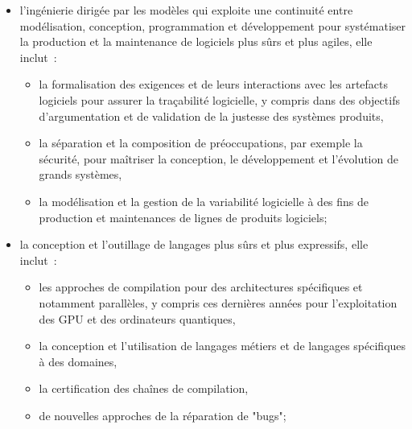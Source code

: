 \documentclass[11pt]{article}
\begin{document}
\begin{itemize}
  \renewcommand{\labelitemi}{$\bullet$}
\item l'ingénierie dirigée par les modèles qui exploite une continuité entre  modélisation, conception, programmation et développement pour systématiser la production et la maintenance de logiciels plus sûrs et plus agiles, elle inclut~:
\begin{itemize}
\item la formalisation des exigences et de leurs interactions avec les artefacts logiciels pour assurer la traçabilité logicielle, y compris dans des objectifs d'argumentation et de validation de la justesse des systèmes produits, 
\item la séparation et la composition de préoccupations, par exemple la sécurité, pour maîtriser la conception, le développement et l'évolution de grands systèmes, 
\item la modélisation et la gestion de la variabilité logicielle à des fins de production et maintenances de lignes de produits logiciels;
\end{itemize}

\item la conception et l'outillage de langages plus sûrs et plus expressifs,  elle inclut~: 
\begin{itemize}
\item les approches de compilation pour des architectures spécifiques et notamment parallèles, y compris ces dernières années pour l'exploitation des GPU et  des ordinateurs quantiques,
\item la conception et l'utilisation de langages métiers et de langages spécifiques à des domaines,
\item la certification des chaînes de compilation,
\item de nouvelles approches de la réparation de "bugs";
\end{itemize}


\end{itemize}
\end{document}

